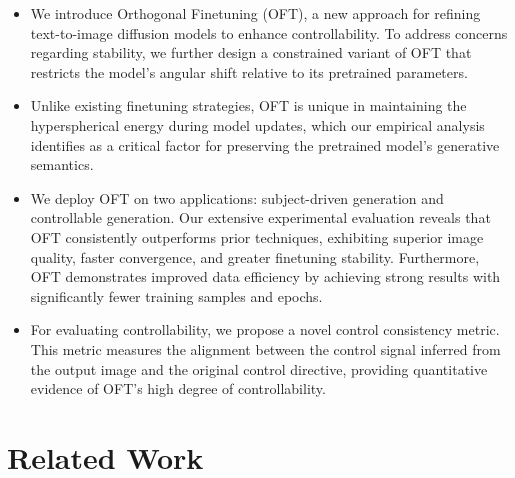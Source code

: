\begin{itemize}[leftmargin=*,nosep]

    \item We introduce Orthogonal Finetuning (OFT), a new approach for refining text-to-image diffusion models to enhance controllability. To address concerns regarding stability, we further design a constrained variant of OFT that restricts the model’s angular shift relative to its pretrained parameters.
    \item Unlike existing finetuning strategies, OFT is unique in maintaining the hyperspherical energy during model updates, which our empirical analysis identifies as a critical factor for preserving the pretrained model’s generative semantics.
    \item We deploy OFT on two applications: subject-driven generation and controllable generation. Our extensive experimental evaluation reveals that OFT consistently outperforms prior techniques, exhibiting superior image quality, faster convergence, and greater finetuning stability. Furthermore, OFT demonstrates improved data efficiency by achieving strong results with significantly fewer training samples and epochs.
    \item For evaluating controllability, we propose a novel control consistency metric. This metric measures the alignment between the control signal inferred from the output image and the original control directive, providing quantitative evidence of OFT's high degree of controllability.
\end{itemize}

\section{Related Work}

